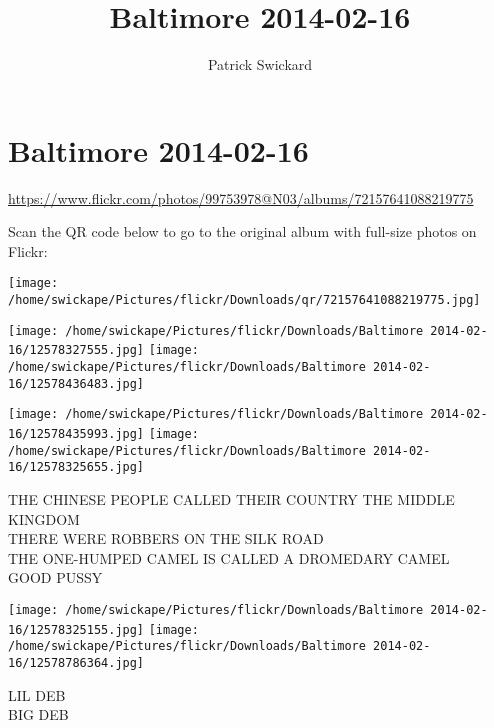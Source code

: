 \documentclass[10pt,letterpaper]{article}
\title{Baltimore 2014-02-16}
\author{Patrick Swickard}
\date{}
\begin{document}
\section*{Baltimore 2014-02-16}

\url{https://www.flickr.com/photos/99753978@N03/albums/72157641088219775}

Scan the QR code below to go to the original album with full-size photos on Flickr:

\texttt{[image: /home/swickape/Pictures/flickr/Downloads/qr/72157641088219775.jpg]}
\pagebreak

\texttt{[image: /home/swickape/Pictures/flickr/Downloads/Baltimore 2014-02-16/12578327555.jpg]}
\texttt{[image: /home/swickape/Pictures/flickr/Downloads/Baltimore 2014-02-16/12578436483.jpg]}

\texttt{[image: /home/swickape/Pictures/flickr/Downloads/Baltimore 2014-02-16/12578435993.jpg]}
\texttt{[image: /home/swickape/Pictures/flickr/Downloads/Baltimore 2014-02-16/12578325655.jpg]}

THE CHINESE PEOPLE CALLED THEIR COUNTRY THE MIDDLE KINGDOM\\
THERE WERE ROBBERS ON THE SILK ROAD\\
THE ONE{-}HUMPED CAMEL IS CALLED A DROMEDARY CAMEL\\
GOOD PUSSY
\pagebreak

\texttt{[image: /home/swickape/Pictures/flickr/Downloads/Baltimore 2014-02-16/12578325155.jpg]}
\texttt{[image: /home/swickape/Pictures/flickr/Downloads/Baltimore 2014-02-16/12578786364.jpg]}

LIL DEB\\
BIG DEB
\pagebreak
\end{document}
